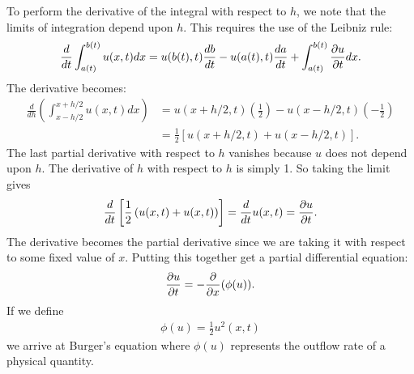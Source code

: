 To perform the derivative of the integral with respect to $h$, we note that the limits of integration depend upon $h$. This requires the use of the Leibniz rule:
\begin{align}
  \frac{d}{dt} \int_{a(t)}^{b(t)} u(x,t) dx = u(b(t),t) \frac{db}{dt} - u(a(t),t) \frac{da}{dt} + \int_{a(t)}^{b(t)} \frac{ \partial {u} }{ \partial {t} } dx .
\end{align}
The derivative becomes:
\begin{align}
  \frac{d}{dh} \left( \int_{x - h/2}^{x + h/2} u(x,t) dx \right) &=  u( x + h/2, t) \left( \frac{1}{2} \right) - u( x - h/2, t) \left( -\frac{1}{2} \right) \nonumber \\
  &= \frac{1}{2} \left[ u( x + h/2, t) + u( x - h/2, t ) \right] .
\end{align}
The last partial derivative with respect to $h$ vanishes because $u$ does not depend upon $h$. The derivative of $h$ with respect to $h$ is simply 1. So taking the limit gives
\begin{align}
  \frac{d}{dt} \left[ \frac{1}{2} \left( u(x,t) + u(x,t) \right) \right] = \frac{d}{dt} u(x,t) = \frac{ \partial {u} }{ \partial {t} } .
\end{align}
The derivative becomes the partial derivative since we are taking it with respect to some fixed value of $x$. Putting this together get a partial differential equation:
\begin{align}
  \frac{ \partial {u} }{ \partial {t} } = -\frac{ \partial {} }{ \partial {x} }( \phi(u) ) .
\end{align}
If we define
\begin{align}
  \phi(u) = \frac{1}{2} u^2(x,t)
\end{align}
we arrive at Burger's equation where $\phi(u)$ represents the outflow rate of a physical quantity.

